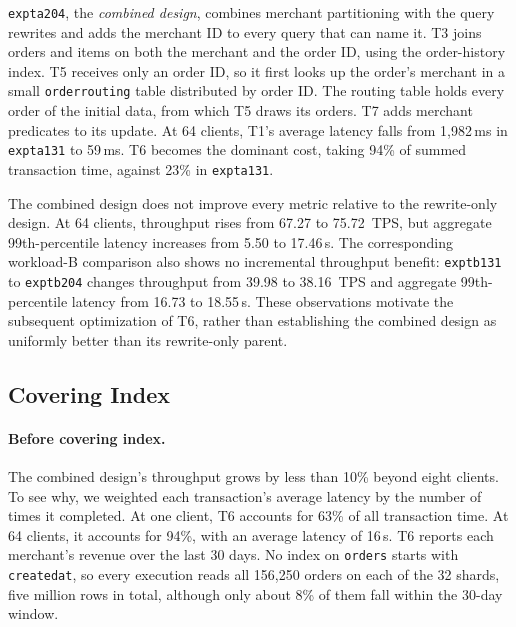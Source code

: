 \documentclass[sigconf,10pt,nonacm]{acmart}
\newcommand{\expt}[1]{\texttt{expt\textunderscore #1}}
\renewcommand{\_}{\underscorewithoutbreak\allowbreak}
\begin{document}
\expt{a204}, the \emph{combined design}, combines merchant partitioning with the
query rewrites and adds the merchant ID to every query that can name it. T3 joins
orders and items on both the merchant and the order ID, using the order-history index.
T5 receives only an order ID, so it first looks up the order's merchant in a small
\texttt{order\_routing} table distributed by order ID. The routing table holds every
order of the initial data, from which T5 draws its orders. T7 adds merchant predicates
to its update. At 64 clients, T1's average latency falls from 1,982\,ms in
\expt{a131} to 59\,ms. T6 becomes the dominant cost, taking 94\% of summed
transaction time, against 23\% in \expt{a131}.

The combined design does not improve every metric relative to the rewrite-only
design. At 64 clients, throughput rises from 67.27 to 75.72~TPS, but aggregate
99th-percentile latency increases from 5.50 to 17.46\,s. The corresponding workload-B
comparison also shows no incremental throughput benefit: \expt{b131} to \expt{b204}
changes throughput from 39.98 to 38.16~TPS and aggregate 99th-percentile latency from
16.73 to 18.55\,s. These observations motivate the subsequent optimization of T6,
rather than establishing the combined design as uniformly better than its
rewrite-only parent.

\subsection{Covering Index}
\label{sec:covering-index}

\paragraph{Before covering index.} The combined design's throughput grows by less than
10\% beyond eight clients. To see why, we weighted each transaction's average latency by
the number of times it completed. At one client, T6 accounts for 63\% of all
transaction time. At 64 clients, it accounts for 94\%, with an average latency of
16\,s. T6 reports each merchant's revenue over the last 30 days. No index on
\texttt{orders} starts with \texttt{created\_at}, so every execution reads all 156,250
orders on each of the 32 shards, five million rows in total, although only about 8\% of
them fall within the 30-day window.
\end{document}
